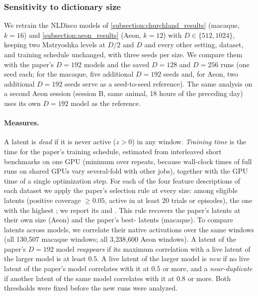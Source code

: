 \subsubsection{Sensitivity to dictionary size}
\label{subsubsection:rebuttal_dictionary_size}

We retrain the NLDisco models of \autoref{subsection:churchland_results} (macaque, $k=16$) and \autoref{subsection:aeon_results} (Aeon, $k=12$) with $D\in\{512,1024\}$, keeping two Matryoshka levels at $D/2$ and $D$ and every other setting, dataset, and training schedule unchanged, with three seeds per size. We compare them with the paper's $D=192$ models and the saved $D=128$ and $D=256$ runs (one seed each; for the macaque, five additional $D=192$ seeds and, for Aeon, two additional $D=192$ seeds serve as a seed-to-seed reference). The same analysis on a second Aeon session (session B, same animal, 18 hours of the preceding day) uses its own $D=192$ model as the reference.

\paragraph{Measures.}
A latent is \textit{dead} if it is never active ($z>0$) in any window. \textit{Training time} is the time for the paper's training schedule, estimated from interleaved short benchmarks on one GPU (minimum over repeats, because wall-clock times of full runs on shared GPUs vary several-fold with other jobs), together with the GPU time of a single optimization step. For each of the four feature descriptions of each dataset we apply the paper's selection rule at every size: among eligible latents (positive coverage $\geq0.05$, active in at least 20 trials or episodes), the one with the highest ; we report its  and . This rule recovers the paper's latents at their own size (Aeon) and the paper's best- latents (macaque). To compare latents across models, we correlate their native activations over the same windows (all 130{,}507 macaque windows; all 3{,}238{,}600 Aeon windows). A latent of the paper's $D=192$ model \textit{reappears} if its maximum correlation with a live latent of the larger model is at least $0.5$. A live latent of the larger model is \textit{new} if no live latent of the paper's model correlates with it at $0.5$ or more, and a \textit{near-duplicate} if another latent of the same model correlates with it at $0.8$ or more. Both thresholds were fixed before the new runs were analyzed.


